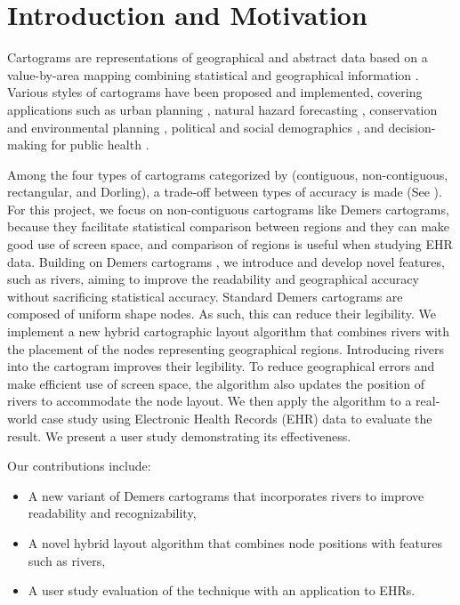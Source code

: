 \section{Introduction and Motivation}

Cartograms are representations of geographical and abstract data based on a value-by-area mapping combining statistical and geographical information \cite{dent2009Cartography}. Various styles of cartograms have been proposed and implemented, covering applications such as urban planning \cite{harris2018Mapping, arranz-lopez2021Enduser}, natural hazard forecasting \cite{pappenberger2019Cartograms, park2020Flood}, conservation and environmental planning \cite{galluzzi2018Mapping, rocchini2019Cartogramming}, political and social demographics \cite{breitzman2018Using, alieva2021How}, and decision-making for public health \cite{gao2020Visualising, sack2021Visualizing}.

Among the four types of cartograms categorized by  (contiguous, non-contiguous, rectangular, and Dorling), a trade-off between types of accuracy is made (See ). For this project, we focus on non-contiguous cartograms like Demers cartograms, because they facilitate statistical comparison between regions and they can make good use of screen space, and comparison of regions is useful when studying EHR data. Building on Demers cartograms \cite{ian2002Cartogram}, we introduce and develop novel features, such as rivers, aiming to improve the readability and geographical accuracy without sacrificing statistical accuracy. Standard Demers cartograms are composed of uniform shape nodes. As such, this can reduce their legibility. We implement a new hybrid cartographic layout algorithm that combines rivers with the placement of the nodes representing geographical regions. Introducing rivers into the cartogram improves their legibility. To reduce geographical errors and make efficient use of screen space, the algorithm also updates the position of rivers to accommodate the node layout. We then apply the algorithm to a real-world case study using Electronic Health Records (EHR) data to evaluate the result. We present a user study demonstrating its effectiveness.

Our contributions include:

\begin{itemize}
    \item A new variant of Demers cartograms that incorporates rivers to improve readability and recognizability,
    \item A novel hybrid layout algorithm that combines node positions with features such as rivers,
    \item A user study evaluation of the technique with an application to EHRs.
\end{itemize}

